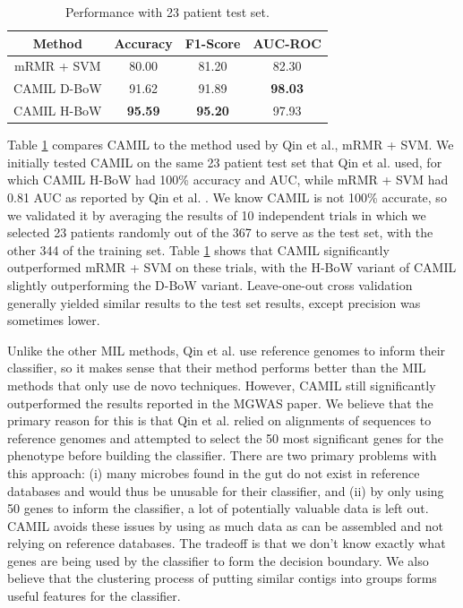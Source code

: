 \begin{table}[h]
\begin{center}
\caption{Performance with 23 patient test set.} 
\label{tab:test-comp}
\begin{tabular}{|c|ccc|}\hline
Method & Accuracy & F1-Score & AUC-ROC\\\hline
mRMR + SVM & 80.00 & 81.20 & 82.30\\\hline 
CAMIL D-BoW & 91.62 & 91.89 & \bf{98.03}\\\hline
CAMIL H-BoW & \bf{95.59} & \bf{95.20} & 97.93\\\hline
\end{tabular}
\end{center}
\end{table}

Table \ref{tab:test-comp} compares CAMIL to the method used by Qin et al., mRMR + SVM. We initially tested CAMIL on the same 23 patient test set that Qin et al. used, for which CAMIL H-BoW had 100\% accuracy and AUC, while mRMR + SVM had 0.81 AUC as reported by Qin et al. \cite{qin041012}. We know CAMIL is not 100\% accurate, so we validated it by averaging the results of 10 independent trials in which we selected 23 patients randomly out of the 367 to serve as the test set, with the other 344 of the training set. Table \ref{tab:test-comp} shows that CAMIL significantly outperformed mRMR + SVM on these trials, with the H-BoW variant of CAMIL slightly outperforming the D-BoW variant. Leave-one-out cross validation generally yielded similar results to the test set results, except precision was sometimes lower.

Unlike the other MIL methods, Qin et al. use reference genomes to inform their classifier, so it makes sense that their method performs better than the MIL methods that only use de novo techniques. However, CAMIL still significantly outperformed the results reported in the MGWAS paper. We believe that the primary reason for this is that Qin et al. relied on alignments of sequences to reference genomes and attempted to select the 50 most significant genes for the phenotype before building the classifier. There are two primary problems with this approach: (i) many microbes found in the gut do not exist in reference databases and would thus be unusable for their classifier, and (ii) by only using 50 genes to inform the classifier, a lot of potentially valuable data is left out. CAMIL avoids these issues by using as much data as can be assembled and not relying on reference databases. The tradeoff is that we don't know exactly what genes are being used by the classifier to form the decision boundary. We also believe that the clustering process of putting similar contigs into groups forms useful features for the classifier.

